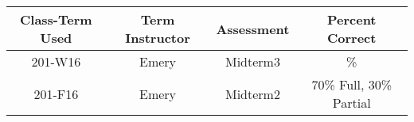 \begin{outcomes}
	\begin{center}
		\begin{tabular}{cccc}
		\hline\hline
			Class-Term Used & Term Instructor & Assessment & Percent Correct\\
			\hline
			201-W16 & Emery & Midterm3 & \%\\    %
			201-F16 & Emery & Midterm2 & 70\% Full, 30\% Partial\\    %
			\hline
		\end{tabular}
	\end{center}
\end{outcomes}

\begin{comments}


	
\end{comments}